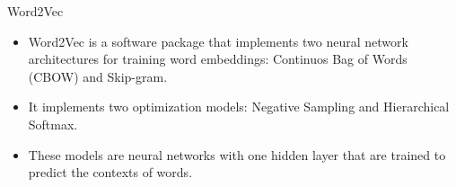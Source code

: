 \begin{frame}{Word2Vec}
\begin{scriptsize}
\begin{itemize}
\item Word2Vec is a software package that implements two neural network architectures for training word embeddings:  Continuos Bag of Words (CBOW) and Skip-gram.
\item It implements two  optimization models: Negative Sampling and Hierarchical Softmax.
\item These models are neural networks with one hidden layer that are trained to predict the contexts of words.
\end{itemize}
\end{scriptsize}
\end{frame}



